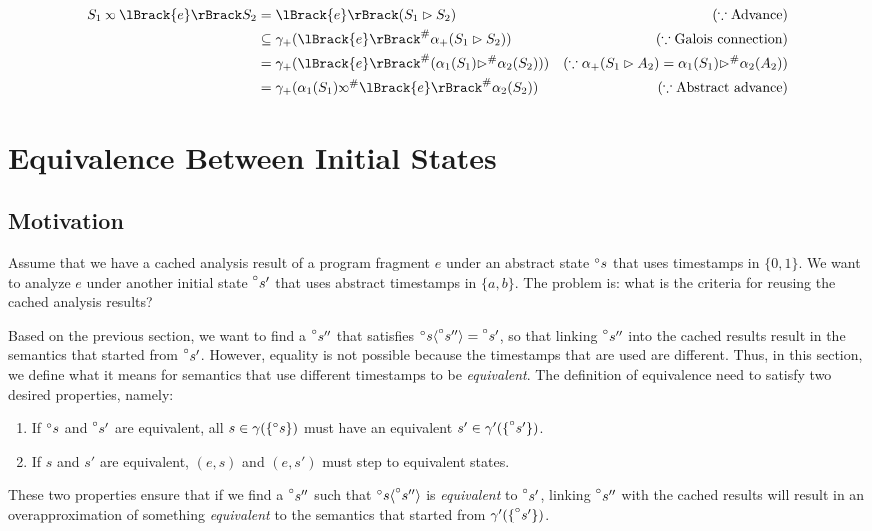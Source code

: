 \documentclass[acmsmall,screen,review]{acmart}\settopmatter{printfolios=true,printccs=false,printacmref=false}
\newcommand*{\A}[1]{\prescript{\circ}{}{#1}}
\newcommand*{\Abs}[1]{{#1}^{\#}}
\newcommand*{\semlink}{\mathbin{\rotatebox[origin=c]{180}{$\propto$}}}
\newcommand*{\sembracket}[1]{\lBrack{#1}\rBrack}
\newcommand*{\inject}[2]{{#2}\langle{#1}\rangle}
\begin{document}
\begin{align*}
  S_1\semlink\sembracket{e}S_2 & =\sembracket{e}(S_1\rhd S_2)                                          & (\because\text{Advance})                                           \\
                               & \subseteq\gamma_+(\Abs{\sembracket{e}}\alpha_+(S_1\rhd S_2))          & (\because\text{Galois connection})                                 \\
                               & =\gamma_+(\Abs{\sembracket{e}}(\alpha_1(S_1)\Abs\rhd\alpha_2(S_2)))   & (\because\alpha_+(S_1\rhd A_2)=\alpha_1(S_1)\Abs\rhd\alpha_2(A_2)) \\
                               & =\gamma_+(\alpha_1(S_1)\Abs\semlink\Abs{\sembracket{e}}\alpha_2(S_2)) & (\because\text{Abstract advance})
\end{align*}
\section{Equivalence Between Initial States}
\subsection{Motivation}
Assume that we have a cached analysis result of a program fragment $e$ under an abstract state $\A{s}$ that uses timestamps in $\{0,1\}$.
We want to analyze $e$ under another initial state $\A{s'}$ that uses abstract timestamps in $\{a,b\}$.
The problem is: what is the criteria for reusing the cached analysis results?

Based on the previous section, we want to find a $\A{s''}$ that satisfies $\inject{\A{s''}}{\A{s}}=\A{s'}$, so that linking $\A{s''}$ into the cached results result in the semantics that started from $\A{s'}$.
However, equality is not possible because the timestamps that are used are different.
Thus, in this section, we define what it means for semantics that use different timestamps to be \emph{equivalent}.
The definition of equivalence need to satisfy two desired properties, namely:
\begin{enumerate}
  \item If $\A{s}$ and $\A{s'}$ are equivalent, all $s\in\gamma(\{\A{s}\})$ must have an equivalent $s'\in\gamma'(\{\A{s'}\})$.
  \item If $s$ and $s'$ are equivalent, $(e,s)$ and $(e,s')$ must step to equivalent states.
\end{enumerate}
These two properties ensure that if we find a $\A{s''}$ such that $\inject{\A{s''}}{\A{s}}$ is \emph{equivalent} to $\A{s'}$, linking $\A{s''}$ with the cached results will result in an overapproximation of something \emph{equivalent} to the semantics that started from $\gamma'(\{\A{s'}\})$.
\end{document}
